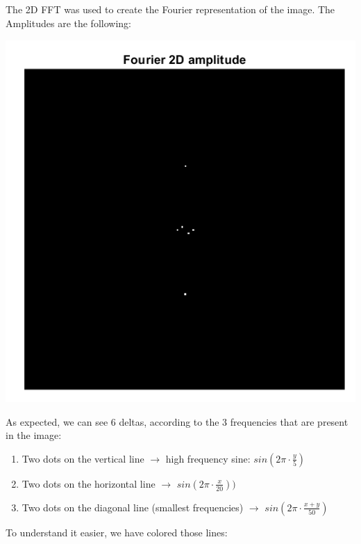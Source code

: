 \documentclass[a4paper]{iacas}
\begin{document}
\subsection{}
The 2D FFT was used to create the Fourier representation of the image. The Amplitudes are the following:

\vskip 0.1in
\begin{minipage}{0.5\textwidth}
	\centering
	\includegraphics[scale=0.7]{../imgs/q1_2.png}
\end{minipage}
\vskip 0.1in

As expected, we can see 6 deltas, according to the 3 frequencies that are present in the image:

\begin{enumerate}
\item Two dots on the vertical line $\rightarrow$ high frequency sine: $sin(2\pi \cdot \frac{y}{5})$
\item Two dots on the horizontal line $\rightarrow$ $sin(2\pi \cdot \frac{x}{20}))$
\item Two dots on the diagonal line (smallest frequencies) $\rightarrow$ $sin(2\pi \cdot \frac{x+y}{50})$
\end{enumerate}

To understand it easier, we have colored those lines:
\end{document}
